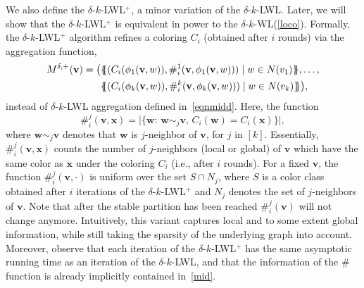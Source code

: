 \documentclass{article}
\theoremstyle{definition}
\renewcommand{\vec}[1]{\mathbf{#1}}
\newcommand{\deltakwl}{$\delta$-$k$-\textsf{WL}\xspace}
\newcommand{\localkwl}{$\delta$-$k$-\textsf{LWL}\xspace}
\newcommand{\pluskwl}{$\delta$-$k$-\textsf{LWL}$^+$\xspace}
\begin{document}
We also define the \pluskwl, a minor variation of the \localkwl. Later, we will show that the \pluskwl is equivalent in power to the \deltakwl (\cref{loco}). 
Formally, the \pluskwl algorithm refines a coloring $C_i$ (obtained after $i$ rounds) via the aggregation function, 
\begin{equation}\label{middp}
\begin{split}
M^{\delta,+}(\vec{v}) =   \big( &\{\!\! \{ (C_i(\phi_1(\vec{v},w)), \#_{i}^1(\vec{v},\phi_1(\vec{v},w))) \hspace{0.4pt}\mid w \in N(v_1) \} \!\!\}, \dots, \\ &\{\!\! \{  (C_i(\phi_k(\vec{v},w)), \#_{i}^k(\vec{v},\phi_k(\vec{v},w))) \mid w \in N(v_k) \}  \!\!\} \big),
\end{split}
\end{equation}
instead of \localkwl aggregation defined in~\cref{eqnmidd}. 
Here, the function
\begin{equation}\label{sharp}
\#_{i}^j(\vec{v}, \vec{x}) = \big|\{ \vec{w} \colon \, \vec{w} \sim_j \vec{v}, \, C_{i}(\vec{w}) = C_{i}(\vec{x})   \} \big|,
\end{equation}
where $\vec{w} \sim_j \vec{v}$ denotes that $\vec{w}$ is $j$-neighbor of $\vec{v}$, for $j$ in $[k]$. Essentially, $\#_{i}^j(\vec{v}, \vec{x})$ counts the number of $j$-neighbors (local or global) of $\vec{v}$ which have the same color as $\vec{x}$ under the coloring $C_i$ (i.e., after $i$ rounds). For a fixed $\vec{v}$,
the function $\#_{i}^j(\vec{v},\cdot)$ is uniform over the set $S \cap N_j$, where $S$ is a color class obtained after $i$ iterations of the \pluskwl and $N_j$ denotes the set of $j$-neighbors of $\vec{v}$. 
Note that after the stable partition has been reached $\#_{i}^j(\vec{v})$ will not change anymore. Intuitively, this variant captures local and to some extent global information, while still taking the sparsity of the underlying graph into account. Moreover, observe that each iteration of the \pluskwl has the same asymptotic running time as an iteration of the \localkwl, and that the information of the $\#$ function is already implicitly contained in~\cref{mid}.
\end{document}
